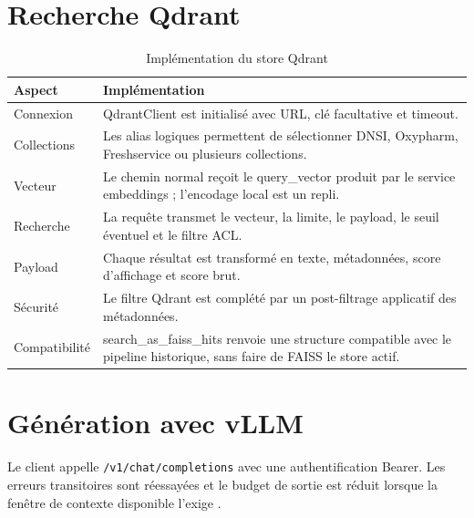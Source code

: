 \section{Recherche Qdrant}
\begin{table}[H]
\centering
\caption{Implémentation du store Qdrant}
\label{tab:qdrant_impl_ch6}
\begin{tabular}{p{3.4cm}p{9.8cm}}
\toprule
\textbf{Aspect} & \textbf{Implémentation} \\
\midrule
Connexion & QdrantClient est initialisé avec URL, clé facultative et timeout. \\
Collections & Les alias logiques permettent de sélectionner DNSI, Oxypharm, Freshservice ou plusieurs collections. \\
Vecteur & Le chemin normal reçoit le query\_vector produit par le service embeddings ; l’encodage local est un repli. \\
Recherche & La requête transmet le vecteur, la limite, le payload, le seuil éventuel et le filtre ACL. \\
Payload & Chaque résultat est transformé en texte, métadonnées, score d’affichage et score brut. \\
Sécurité & Le filtre Qdrant est complété par un post-filtrage applicatif des métadonnées. \\
Compatibilité & search\_as\_faiss\_hits renvoie une structure compatible avec le pipeline historique, sans faire de FAISS le store actif. \\
\bottomrule
\end{tabular}
\end{table}

\section{Génération avec vLLM}
Le client appelle \texttt{/v1/chat/completions} avec une authentification Bearer. Les erreurs transitoires sont réessayées et le budget de sortie est réduit lorsque la fenêtre de contexte disponible l'exige \citep{VLLMServer2026}.